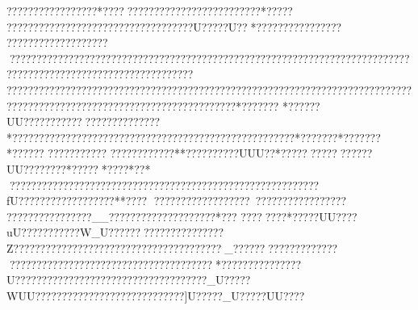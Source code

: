 {{{{{{{{{{{{{{{{{{{{{{{{{{{{{{{{{{{{{{{{{{{{{{{{{{{{{{{{{{{{{{{{{{{{{{{{{{{{{{{{{{{{{{{{{{{{{{{{{{{{{{{{{{{{{{{{{{{{{{{{{{{{{{{{{{{{{{{{{{{{{{{{{{{{{{{{{{{{{{{{{{{{{{{{{{{{{{{{{{{{{{{{{{{{{{{{{{{{{{{{{{{{{{{{{{{{{{{{{{{{{{{{{{{{{{{{{{{{{{{{{{{{{{{{{{{{{{{{{{{{{{{{{{{{{{{{{{{{{{{{{{{{{{{{{{{{{{{{{{{{{{{{{{{{{{{{{{{{{{{{{{{{{{{{{{{{{{{{{{{{{{{{{{{{{{{{{{{{{{{{{{{{{{{{{{{{{{{{{{{{{{{{{{{{{{{{{{{{{{{{{{{{{{{{{{{{{{{{{{{{{{{{{{{{{{{{{{{{{{{{{{{{{{{{{{{{{{{{{{{{{{{{{{{{{{{{{{{{{{{{{{{{{{{{{{{{{{{{{{{{{{{{{{{{{{{{{{{{{{{{{{{{{{{{{{{{{{{{{{{{{{{{{{{{{{{{{{{{{{{{{{{{{{{{{{{{{{{{{{{{{{{{{{{{{{{{{{{{{{{{{{{{{{{{{{{{{{{{{{{{{{{{{{{{{{{{{{{{{{{{{{{{{{{{{{{{{{{{{{{{{{{{{{{{{{{{{{{{{{{{{{{{{{{{{{{{{{{{{{{{{{{{{{{{{{{{{{{{{{{{{{{{{{{{{{{{{{{{{{{{{{{{{{{{{{{{{{{{{{{{{{{{{{{{{{{{{{{{{{{{{{{{{{{{{{{{{{{{{{{{{{{{{{{{{{{{{{{{{{{{{{{{{{{{{{{{{{{{{{{{{{{{{{{{{{{{{{{{{{{{{{{{{{{{{{{{{{{{{{{{{{{{{{{{{{{{{{{{{{{{{{{{{{{{{{{{{{{{{{{{{{{{{{{{{{{{{{{{{{{{{{{{{{{{{{{{{{{{{{{{{{{{{{{{{{{{{{{{{{{{{{{{{{{{{{{{{{{{{{{{{{{{{{{{{{{{{{{{{{{{{{{{{{{{{{{{{{{{{{{{{{{{{{{{{{{{{{{{{{{{{{{{{{{{{{{{{{{{{{{{{{{{{{{{{{{{{{{{{{{{{{{{{{{{{{{{{{{{{{{{{{{{{{{{{{{{{{{{{{{{{{{{{{{{{{{{{{{{{{{{{{{{{{{{{{{{{{{{{{{{{{{{{{{{{{{{{{{{{{{{{{{{{{{{{{{{{{{{{{{{{{{{{{{{{{{{{{{{{{{{{{{{{{{{{{{{{{{{{{{{{{{{{{{{{{{{{{{{????????????????? *????  ???  ??????????????????????*?????
???????????????????????????????????U?????U??*????????????????   
?????????????????????????????????????????????????????????????????????????????????????????????????????????????????????????????????
?????????????? ?????????????????????????????????????????????????????????????????????????????????????????????????????????*??????? 
*??????UU?????????????????? ??????? *?????? ???????????????????????????????????????????????*???????*??????? *?????? 
??????  ?????
?????? ?????? **??????????UUU??*?????????? ??????UU????????*????? *????   *??*
 ??????????????????????????????????????????????????????????fU?????????    ?????????**????  
??    ??    ??    ????????    ??    ??~??????????????   ???   ????? ???????????__???   ?????????????????  *??? 
???? ????   *?????UU????uU???????????W_U?????????????????????Z??????????? ????????????????????????????_?????????????????????????????????????????????????????????*????? ??????????U????????????????????????????????????_U?????WUU????????????????????????????]U?????_U?????UU????   }}}}}}}}}}}}}}}}}}}}}}}}}}}}}}}}}}}}}}}}}}}}}}}}}}}}}}}}}}}}}}}}}}}}}}}}}}}}}}}}}}}}}}}}}}}}}}}}}}}}}}}}}}}}}}}}}}}}}}}}}}}}}}}}}}}}}}}}}}}}}}}}}}}}}}}}}}}}}}}}}}}}}}}}}}}}}}}}}}}}}}}}}}}}}}}}}}}}}}}}}}}}}}}}}}}}}}}}}}}}}}}}}}}}}}}}}}}}}}}}}}}}}}}}}}}}}}}}}}}}}}}}}}}}}}}}}}}}}}}}}}}}}}}}}}}}}}}}}}}}}}}}}}}}}}}}}}}}}}}}}}}}}}}}}}}}}}}}}}}}}}}}}}}}}}}}}}}}}}}}}}}}}}}}}}}}}}}}}}}}}}}}}}}}}}}}}}}}}}}}}}}}}}}}}}}}}}}}}}}}}}}}}}}}}}}}}}}}}}}}}}}}}}}}}}}}}}}}}}}}}}}}}}}}}}}}}}}}}}}}}}}}}}}}}}}}}}}}}}}}}}}}}}}}}}}}}}}}}}}}}}}}}}}}}}}}}}}}}}}}}}}}}}}}}}}}}}}}}}}}}}}}}}}}}}}}}}}}}}}}}}}}}}}}}}}}}}}}}}}}}}}}}}}}}}}}}}}}}}}}}}}}}}}}}}}}}}}}}}}}}}}}}}}}}}}}}}}}}}}}}}}}}}}}}}}}}}}}}}}}}}}}}}}}}}}}}}}}}}}}}}}}}}}}}}}}}}}}}}}}}}}}}}}}}}}}}}}}}}}}}}}}}}}}}}}}}}}}}}}}}}}}}}}}}}}}}}}}}}}}}}}}}}}}}}}}}}}}}}}}}}}}}}}}}}}}}}}}}}}}}}}}}}}}}}}}}}}}}}}}}}}}}}}}}}}}}}}}}}}}}}}}}}}}}}}}}}}}}}}}}}}}}}}}}}}}}}}}}}}}}}}}}}}}}}}}}}}}}}}}}}}}}}}}}}}}}}}}}}}}}}}}}}}}}}}}}}}}}}}}}}}}}}}}}}}}}}}}}}}}}}}}}}}}}}}}}}}}}}}}}}}}}}}}}}}}}}}}}}}}}}}}}}}}}}}}}}}}}}}}}}}}}}}}}}}}}}}}}}}}}}}}}}}}}}}}}}}}}}}}}}}}}}}}}}}}}}}}}}}}}}}}}}}}}}}}}}}}}}}}}}}}}}}}}}}}}}}}}}}}}}}}}}}}}}}}}}}}}}}}}}}}}}}}}}}}}}}}}}}}}}}}}}}}}}}}}}}}}}}}}}}}}}}}}}}}}}}}}}}}}}}}}}}}}}}}}}}}}}}}}}}}}}}}}}}}}}}}}}}}}}}}}}}}}}}}}}}}
